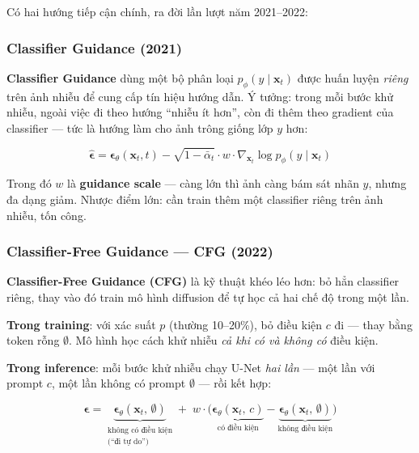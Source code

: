 Có hai hướng tiếp cận chính, ra đời lần lượt năm 2021--2022:

\subsubsection{Classifier Guidance (2021)}

\textbf{Classifier Guidance} \cite{Dhariwal2021} dùng một bộ phân loại $p_\phi(y \mid \mathbf{x}_t)$ được huấn luyện \textit{riêng} trên ảnh nhiễu để cung cấp tín hiệu hướng dẫn. Ý tưởng: trong mỗi bước khử nhiễu, ngoài việc đi theo hướng ``nhiễu ít hơn'', còn đi thêm theo gradient của classifier --- tức là hướng làm cho ảnh trông giống lớp $y$ hơn:

\[
    \hat{\boldsymbol{\epsilon}} = \boldsymbol{\epsilon}_\theta(\mathbf{x}_t, t) - \sqrt{1 - \bar{\alpha}_t} \cdot w \cdot \nabla_{\mathbf{x}_t} \log p_\phi(y \mid \mathbf{x}_t)
\]

Trong đó $w$ là \textbf{guidance scale} --- càng lớn thì ảnh càng bám sát nhãn $y$, nhưng đa dạng giảm. Nhược điểm lớn: cần train thêm một classifier riêng trên ảnh nhiễu, tốn công.

\subsubsection{Classifier-Free Guidance --- CFG (2022)}

\textbf{Classifier-Free Guidance (CFG)} \cite{Ho2022} là kỹ thuật khéo léo hơn: bỏ hẳn classifier riêng, thay vào đó train mô hình diffusion để tự học cả hai chế độ trong một lần.

\textbf{Trong training}: với xác suất $p$ (thường 10--20\%), bỏ điều kiện $c$ đi --- thay bằng token rỗng $\emptyset$. Mô hình học cách khử nhiễu \textit{cả khi có và không có} điều kiện.

\textbf{Trong inference}: mỗi bước khử nhiễu chạy U-Net \textit{hai lần} --- một lần với prompt $c$, một lần không có prompt $\emptyset$ --- rồi kết hợp:

\begin{equation}
    \hat{\boldsymbol{\epsilon}} = \underbrace{\boldsymbol{\epsilon}_\theta(\mathbf{x}_t,\, \emptyset)}_{\substack{\text{không có điều kiện} \\ \text{(``đi tự do'')}}} + \; w \cdot \Big(\underbrace{\boldsymbol{\epsilon}_\theta(\mathbf{x}_t,\, c)}_{\text{có điều kiện}} - \underbrace{\boldsymbol{\epsilon}_\theta(\mathbf{x}_t,\, \emptyset)}_{\text{không điều kiện}}\Big)
\end{equation}

